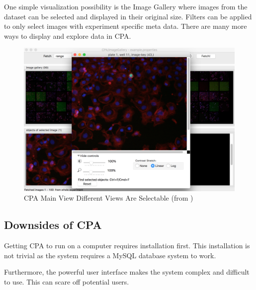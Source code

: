 One simple visualization possibility is the Image Gallery where images from the dataset can be selected and 
displayed in their original size. Filters can be applied to only select images with experiment specific meta data. 
There are many more ways to display and explore data in CPA.

\begin{figure}[H]
	\centering
	\includegraphics[width=1.0\linewidth]{bilder/related_work/visualization.png}
	\caption{CPA Main View Different Views Are Selectable (from \cite{Jones2008})}
	\label{fig:RL}
\end{figure}


\subsection{Downsides of CPA}
Getting CPA to run on a computer requires installation first. This installation is
not trivial as the system requires a MySQL database system to work.

Furthermore, the powerful user interface makes the system complex and difficult to use. This can 
scare off potential users.





